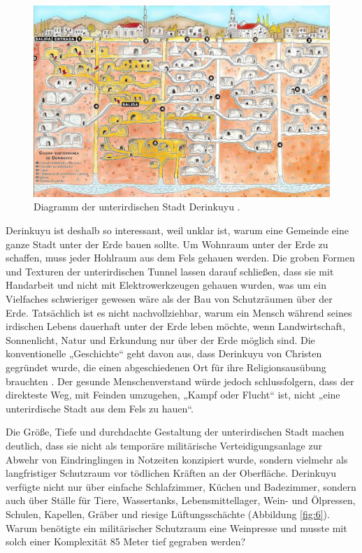 \documentclass[10pt,twocolumn,letterpaper]{article}
\begin{document}
\begin{figure}[b]
\begin{center}
   \includegraphics[width=1\linewidth]{derinkuyu.jpeg}
\end{center}
   \caption{Diagramm der unterirdischen Stadt Derinkuyu \cite{56}.}
\label{fig:5}
\label{fig:onecol}
\end{figure}
Derinkuyu ist deshalb so interessant, weil unklar ist, warum eine Gemeinde eine ganze Stadt unter der Erde bauen sollte. Um Wohnraum unter der Erde zu schaffen, muss jeder Hohlraum aus dem Fels gehauen werden. Die groben Formen und Texturen der unterirdischen Tunnel lassen darauf schließen, dass sie mit Handarbeit und nicht mit Elektrowerkzeugen gehauen wurden, was um ein Vielfaches schwieriger gewesen wäre als der Bau von Schutzräumen über der Erde. Tatsächlich ist es nicht nachvollziehbar, warum ein Mensch während seines irdischen Lebens dauerhaft unter der Erde leben möchte, wenn Landwirtschaft, Sonnenlicht, Natur und Erkundung nur über der Erde möglich sind. Die konventionelle „Geschichte“ geht davon aus, dass Derinkuyu von Christen gegründet wurde, die einen abgeschiedenen Ort für ihre Religionsausübung brauchten \cite{53}. Der gesunde Menschenverstand würde jedoch schlussfolgern, dass der direkteste Weg, mit Feinden umzugehen, „Kampf oder Flucht“ ist, nicht „eine unterirdische Stadt aus dem Fels zu hauen“.

Die Größe, Tiefe und durchdachte Gestaltung der unterirdischen Stadt machen deutlich, dass sie nicht als temporäre militärische Verteidigungsanlage zur Abwehr von Eindringlingen in Notzeiten konzipiert wurde, sondern vielmehr als langfristiger Schutzraum vor tödlichen Kräften an der Oberfläche. Derinkuyu verfügte nicht nur über einfache Schlafzimmer, Küchen und Badezimmer, sondern auch über Ställe für Tiere, Wassertanks, Lebensmittellager, Wein- und Ölpressen, Schulen, Kapellen, Gräber und riesige Lüftungsschächte (Abbildung \ref{fig:6}). Warum benötigte ein militärischer Schutzraum eine Weinpresse und musste mit solch einer Komplexität 85 Meter tief gegraben werden?
\end{document}

